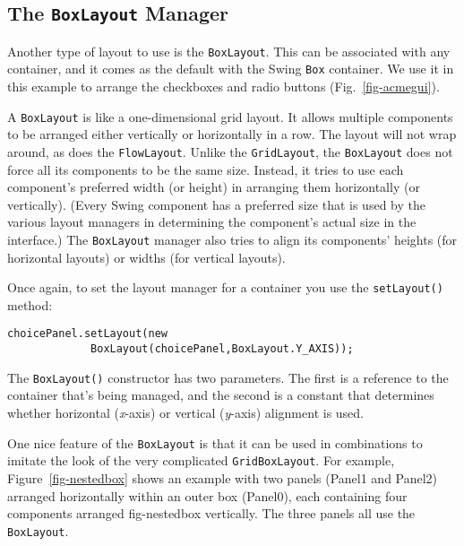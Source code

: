 \subsection{The {\tt BoxLayout} Manager}
\noindent Another type of layout to use is the {\tt BoxLayout}. This can be
associated with any container, and it comes as the default with the
Swing {\tt Box} container. We use it in this example to arrange the
checkboxes and radio buttons (Fig.~\ref{fig-acmegui}).

A {\tt BoxLayout} is like a one-dimensional grid layout. It allows
multiple components to be arranged either vertically or horizontally
in a row.  The layout will not wrap around, as does the
{\tt FlowLayout}. Unlike the {\tt GridLayout}, the {\tt BoxLayout} does not
force all its components to be the same size. Instead, it tries to use
each component's preferred width (or height) in arranging them
horizontally (or vertically).
(Every Swing component has a preferred
size that is used by the various layout managers in determining the
component's actual size in the interface.)  The {\tt BoxLayout}
manager also tries to align its components' heights (for horizontal
layouts) or widths (for vertical layouts).


Once again, to set the layout manager for a container you use the
{\tt setLayout()} method:

\begin{jjjlisting}
\begin{lstlisting}
choicePanel.setLayout(new 
             BoxLayout(choicePanel,BoxLayout.Y_AXIS));
\end{lstlisting}
\end{jjjlisting}

\noindent The {\tt BoxLayout()} constructor has two parameters. The
first is a reference to the container that's being managed, and the
second is a constant that determines whether horizontal ({\it x}-axis) or
vertical ({\it y}-axis) alignment is used.

One nice feature of the {\tt BoxLayout} is that it can be used in
combinations to imitate the look of the very complicated
{\tt GridBoxLayout}. For example, Figure~\ref{fig-nestedbox} shows an
example with two panels (Panel1 and Panel2) arranged horizontally
within an outer box (Panel0), each containing four components arranged
{fig-nestedbox}
vertically. The three panels all use the {\tt BoxLayout}.


